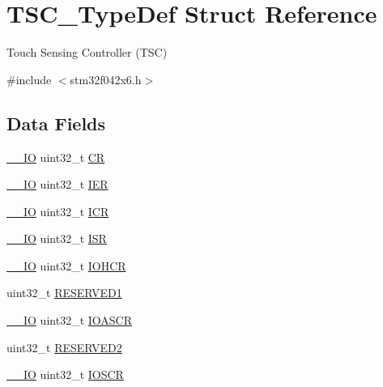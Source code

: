 \hypertarget{struct_t_s_c___type_def}{}\section{T\+S\+C\+\_\+\+Type\+Def Struct Reference}
\label{struct_t_s_c___type_def}


Touch Sensing Controller (T\+SC)  




{\ttfamily \#include $<$stm32f042x6.\+h$>$}

\subsection*{Data Fields}
\begin{DoxyCompactItemize}
\item 
\hyperlink{core__sc300_8h_aec43007d9998a0a0e01faede4133d6be}{\+\_\+\+\_\+\+IO} uint32\+\_\+t \hyperlink{struct_t_s_c___type_def_ab40c89c59391aaa9d9a8ec011dd0907a}{CR}
\item 
\hyperlink{core__sc300_8h_aec43007d9998a0a0e01faede4133d6be}{\+\_\+\+\_\+\+IO} uint32\+\_\+t \hyperlink{struct_t_s_c___type_def_a6566f8cfbd1d8aa7e8db046aa35e77db}{I\+ER}
\item 
\hyperlink{core__sc300_8h_aec43007d9998a0a0e01faede4133d6be}{\+\_\+\+\_\+\+IO} uint32\+\_\+t \hyperlink{struct_t_s_c___type_def_a0a8c8230846fd8ff154b9fde8dfa0399}{I\+CR}
\item 
\hyperlink{core__sc300_8h_aec43007d9998a0a0e01faede4133d6be}{\+\_\+\+\_\+\+IO} uint32\+\_\+t \hyperlink{struct_t_s_c___type_def_ab3c49a96815fcbee63d95e1e74f20e75}{I\+SR}
\item 
\hyperlink{core__sc300_8h_aec43007d9998a0a0e01faede4133d6be}{\+\_\+\+\_\+\+IO} uint32\+\_\+t \hyperlink{struct_t_s_c___type_def_a2eaed98d8be30aa1f577f65817e37b2d}{I\+O\+H\+CR}
\item 
uint32\+\_\+t \hyperlink{struct_t_s_c___type_def_ac4ac04e673b5b8320d53f7b0947db902}{R\+E\+S\+E\+R\+V\+E\+D1}
\item 
\hyperlink{core__sc300_8h_aec43007d9998a0a0e01faede4133d6be}{\+\_\+\+\_\+\+IO} uint32\+\_\+t \hyperlink{struct_t_s_c___type_def_aeff4f7701e46bc9c662eff485349df74}{I\+O\+A\+S\+CR}
\item 
uint32\+\_\+t \hyperlink{struct_t_s_c___type_def_a4c9b972a304c0e08ca27cbe57627c496}{R\+E\+S\+E\+R\+V\+E\+D2}
\item 
\hyperlink{core__sc300_8h_aec43007d9998a0a0e01faede4133d6be}{\+\_\+\+\_\+\+IO} uint32\+\_\+t \hyperlink{struct_t_s_c___type_def_af63334a3c8d2a8672fb7b603e4832817}{I\+O\+S\+CR}

\end{DoxyCompactItemize}
